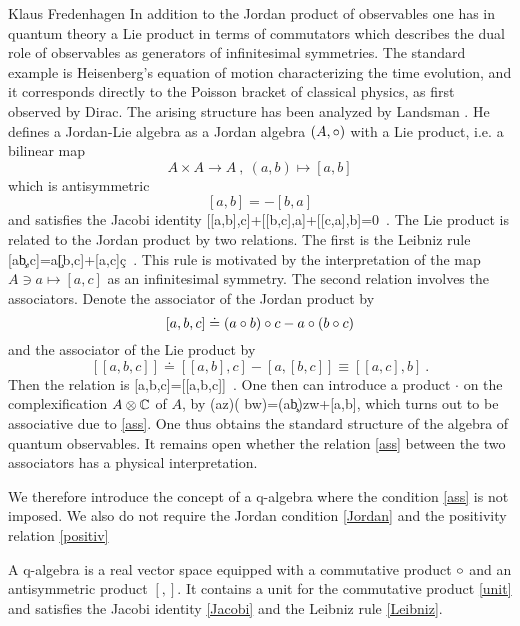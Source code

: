 \begin{artengenv}{Klaus Fredenhagen}
In addition to the Jordan product of observables one has in quantum theory a Lie product in terms of commutators which describes the dual role of observables as generators of infinitesimal symmetries. The standard example is Heisenberg's equation of motion
characterizing the time evolution, and it corresponds directly to the Poisson bracket of classical physics, as first observed by Dirac. The arising structure has been analyzed by Landsman \parencite*{Landsman}. He defines a Jordan-Lie algebra as a Jordan algebra $(A,\circ)$ with a Lie product, i.e. a bilinear map   
\[
A\times A\to A\ ,\ (a,b)\mapsto [a,b]
\]
which is antisymmetric
\[ [a,b]=-[b,a]\]
and satisfies the Jacobi identity
\be\label{Jacobi}[[a,b],c]+[[b,c],a]+[[c,a],b]=0\ .\ee
The Lie product is related to the Jordan product by two relations. The first is the Leibniz rule
\be\label{Leibniz}[a\c b,c]=a\c[b,c]+[a,c]\c c\ .\ee
This rule is motivated by the interpretation of the map $A\ni a\mapsto[a,c]$ as an infinitesimal symmetry.
The second relation involves the associators. 
Denote the associator of the Jordan product by
\[[a,b,c]\doteq(a\circ b)\circ c-a\circ(b\circ c)\]
and the associator of the Lie product by
\[[[a,b,c]]\doteq[[a,b],c]-[a,[b,c]]\equiv[[a,c],b]\ .\]
Then the relation is
\be\label{ass}[a,b,c]=[[a,b,c]]\ .\ee
\newcommand{\ot}{\otimes}
One then can introduce a product $\cdot$ on the complexification $A\ot\CC$ of $A$, by
\be\label{complex} (a\ot z)\cdot( b\ot w)=(a\c b)\ot zw+[a,b]\ot{},\ee
which turns out to be associative due to \eqref{ass}. One thus obtains the standard structure of the algebra of quantum observables.
It remains open whether the relation \eqref{ass} between the two associators has a physical interpretation.

We therefore introduce the concept of a q-algebra where the condition \eqref{ass} is not imposed. We also do not require the Jordan condition \eqref{Jordan} and the positivity relation \eqref{positiv}
\begin{definition-fred}
A q-algebra is a real vector space equipped with a commutative product $\circ$ and an antisymmetric product $[,]$. It contains a unit for the commutative product \eqref{unit} and satisfies the Jacobi identity \eqref{Jacobi} and the Leibniz rule \eqref{Leibniz}.
\end{definition-fred}



\end{artengenv}
